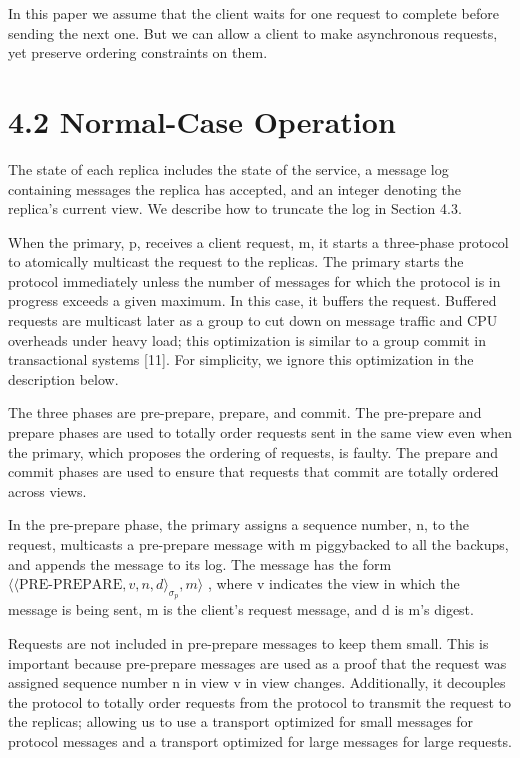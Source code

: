 \documentclass[
]{article}
\begin{document}
In this paper we assume that the client waits for one request to
complete before sending the next one. But we can allow a client to make
asynchronous requests, yet preserve ordering constraints on them.

\section{4.2 Normal-Case Operation}\label{normal-case-operation}

The state of each replica includes the state of the service, a message
log containing messages the replica has accepted, and an integer
denoting the replica's current view. We describe how to truncate the log
in Section 4.3.

When the primary, p, receives a client request, m, it starts a
three-phase protocol to atomically multicast the request to the
replicas. The primary starts the protocol immediately unless the number
of messages for which the protocol is in progress exceeds a given
maximum. In this case, it buffers the request. Buffered requests are
multicast later as a group to cut down on message traffic and CPU
overheads under heavy load; this optimization is similar to a group
commit in transactional systems {[}11{]}. For simplicity, we ignore this
optimization in the description below.

The three phases are pre-prepare, prepare, and commit. The pre-prepare
and prepare phases are used to totally order requests sent in the same
view even when the primary, which proposes the ordering of requests, is
faulty. The prepare and commit phases are used to ensure that requests
that commit are totally ordered across views.

In the pre-prepare phase, the primary assigns a sequence number, n, to
the request, multicasts a pre-prepare message with m piggybacked to all
the backups, and appends the message to its log. The message has the
form
\(\langle\langle\text{PRE-PREPARE},v,n,d\rangle_{\sigma_{p}},m\rangle\)
, where v indicates the view in which the message is being sent, m is
the client's request message, and d is m's digest.

Requests are not included in pre-prepare messages to keep them small.
This is important because pre-prepare messages are used as a proof that
the request was assigned sequence number n in view v in view changes.
Additionally, it decouples the protocol to totally order requests from
the protocol to transmit the request to the replicas; allowing us to use
a transport optimized for small messages for protocol messages and a
transport optimized for large messages for large requests.
\end{document}
